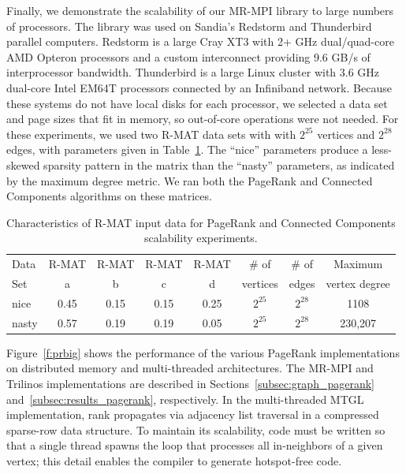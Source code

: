 Finally, we demonstrate the scalability of our MR-MPI library to large
numbers of processors.  The library was used on Sandia's Redstorm and
Thunderbird parallel computers.  Redstorm is a large Cray XT3 with 2+
{GHz} dual/quad-core AMD Opteron processors and a custom interconnect
providing 9.6 GB/s of interprocessor bandwidth.  Thunderbird is a
large Linux cluster with 3.6 {GHz} dual-core Intel EM64T processors
connected by an Infiniband network.  Because these systems do not have
local disks for each processor, we selected a data set and page sizes
that fit in memory, so out-of-core operations were not needed.  For
these experiments, we used two R-MAT data sets with with $2^{25}$
vertices and $2^{28}$ edges, with parameters given in
Table~\ref{t:rmat}.  The ``nice'' parameters produce a less-skewed
sparsity pattern in the matrix than the ``nasty'' parameters, as
indicated by the maximum degree metric.  We ran both the PageRank and
Connected Components algorithms on these matrices.

\begin{table}
\begin{center}
\begin{tabular}{|l|c|c|c|c|c|c|c|}
\hline
Data & R-MAT  & R-MAT  & R-MAT  & R-MAT  & \# of    & \# of & Maximum \\
Set  & a      & b      & c      & d      & vertices & edges & vertex degree\\
\hline
nice  & 0.45 & 0.15 & 0.15 & 0.25 & $2^{25}$ & $2^{28}$ & 1108 \\
nasty & 0.57 & 0.19 & 0.19 & 0.05 & $2^{25}$ & $2^{28}$ & 230,207\\
\hline
\end{tabular}
\caption{Characteristics of R-MAT input data for PageRank and Connected
Components scalability experiments.}
\label{t:rmat}
\end{center}
\end{table}

Figure~\ref{f:prbig} shows the performance of the various PageRank
implementations on distributed memory and multi-threaded
architectures.  The MR-MPI and Trilinos implementations are described
in Sections~\ref{subsec:graph_pagerank}
and~\ref{subsec:results_pagerank}, respectively.  In the
multi-threaded MTGL implementation, rank propagates via adjacency list
traversal in a compressed sparse-row data structure.  To maintain its
scalability, code must be written so that a single thread spawns the
loop that processes all in-neighbors of a given vertex; this detail
enables the compiler to generate hotspot-free code.


